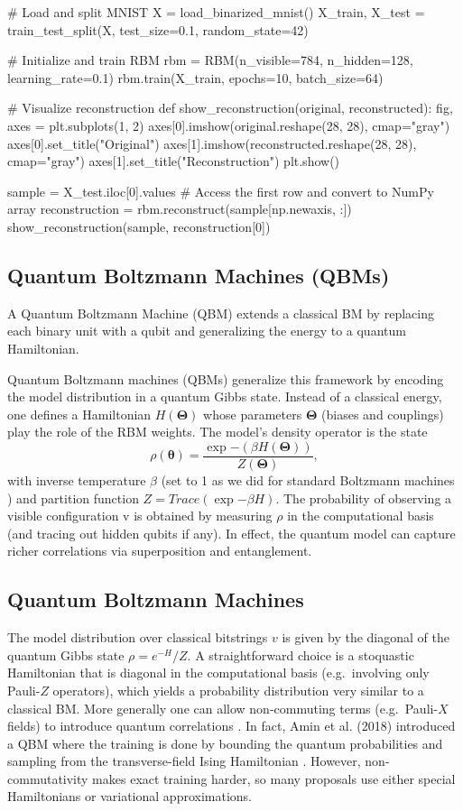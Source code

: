 \documentclass[%
oneside,                 %
final,                   %
10pt]{article}
\begin{document}
# Load and split MNIST
X = load_binarized_mnist()
X_train, X_test = train_test_split(X, test_size=0.1, random_state=42)

# Initialize and train RBM
rbm = RBM(n_visible=784, n_hidden=128, learning_rate=0.1)
rbm.train(X_train, epochs=10, batch_size=64)

# Visualize reconstruction
def show_reconstruction(original, reconstructed):
    fig, axes = plt.subplots(1, 2)
    axes[0].imshow(original.reshape(28, 28), cmap="gray")
    axes[0].set_title("Original")
    axes[1].imshow(reconstructed.reshape(28, 28), cmap="gray")
    axes[1].set_title("Reconstruction")
    plt.show()

sample = X_test.iloc[0].values # Access the first row and convert to NumPy array
reconstruction = rbm.reconstruct(sample[np.newaxis, :])
show_reconstruction(sample, reconstruction[0])


\epycod


\subsection{Quantum Boltzmann Machines (QBMs)}

A Quantum Boltzmann Machine (QBM) extends a classical BM by replacing
each binary unit with a qubit and generalizing the energy to a quantum
Hamiltonian.

Quantum Boltzmann machines (QBMs) generalize this framework by
encoding the model distribution in a quantum Gibbs state.  Instead of
a classical energy, one defines a Hamiltonian $H(\boldsymbol{\Theta})$
whose parameters $\boldsymbol{\Theta}$ (biases and couplings) play the
role of the RBM weights.  The model’s density operator is the state
\[
\rho(\boldsymbol{\theta}) = \frac{\exp{-(\beta H(\boldsymbol{\Theta}))}}{Z(\boldsymbol{\Theta})},
\]
with inverse temperature $\beta$ (set to 1 as we did for standard Boltzmann machines ) and partition function
$Z = Trace(\exp{-\beta H})$.  The probability of observing a visible
configuration v is obtained by measuring $\rho$ in the computational
basis (and tracing out hidden qubits if any).  In effect, the quantum
model can capture richer correlations via superposition and
entanglement.

\subsection{Quantum Boltzmann Machines}

The model distribution over
classical bitstrings $v$ is given by the diagonal of the quantum Gibbs
state $\rho = e^{-H}/Z$.  A straightforward choice is a stoquastic
Hamiltonian that is diagonal in the computational basis
(e.g.~involving only Pauli-$Z$ operators), which yields a probability
distribution very similar to a classical BM.  More generally one can
allow non-commuting terms (e.g.~Pauli-$X$ fields) to introduce quantum
correlations .  In fact, Amin et al. (2018) introduced a QBM where the
training is done by bounding the quantum probabilities and sampling
from the transverse-field Ising Hamiltonian .  However,
non-commutativity makes exact training harder, so many proposals use
either special Hamiltonians or variational approximations.
\end{document}
